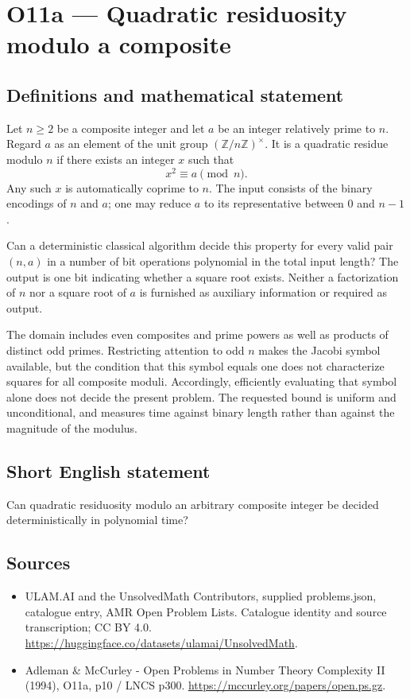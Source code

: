 \documentclass[11pt,a4paper]{article}
\begin{document}
\section*{O11a — Quadratic residuosity modulo a composite}\label{statement}

\subsection{Definitions and mathematical statement}
Let $n\ge2$ be a composite integer and let $a$ be an integer relatively prime to $n$. Regard $a$ as an element of the unit group $(\mathbb Z/n\mathbb Z)^\times$. It is a quadratic residue modulo $n$ if there exists an integer $x$ such that
\[
x^2\equiv a\pmod n.
\]
Any such $x$ is automatically coprime to $n$. The input consists of the binary encodings of $n$ and $a$; one may reduce $a$ to its representative between $0$ and $n-1$.

Can a deterministic classical algorithm decide this property for every valid pair $(n,a)$ in a number of bit operations polynomial in the total input length? The output is one bit indicating whether a square root exists. Neither a factorization of $n$ nor a square root of $a$ is furnished as auxiliary information or required as output.

The domain includes even composites and prime powers as well as products of distinct odd primes. Restricting attention to odd $n$ makes the Jacobi symbol available, but the condition that this symbol equals one does not characterize squares for all composite moduli. Accordingly, efficiently evaluating that symbol alone does not decide the present problem. The requested bound is uniform and unconditional, and measures time against binary length rather than against the magnitude of the modulus.
\subsection{Short English statement}
Can quadratic residuosity modulo an arbitrary composite integer be decided deterministically in polynomial time?
\subsection{Sources}
\begin{itemize}
\item[S1] ULAM.AI and the UnsolvedMath Contributors, supplied problems.json, catalogue entry, AMR Open Problem Lists. Catalogue identity and source transcription; CC BY 4.0.
\url{https://huggingface.co/datasets/ulamai/UnsolvedMath}.
\item[S2] Adleman \& McCurley - Open Problems in Number Theory Complexity II (1994), O11a, p10 / LNCS p300. 
\url{https://mccurley.org/papers/open.ps.gz}.
\end{itemize}
\end{document}
